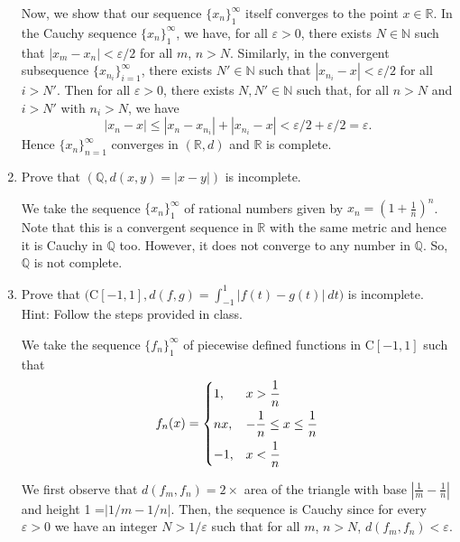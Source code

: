\documentclass[12pt]{article}
\newcommand{\rl}{\mathbb{R}}
\newcommand{\mQ}{\mathbb{Q}}
\begin{document}
\begin{enumerate}
\begin{mybox}
    \vspace*{3mm}
    Now, we show that our sequence
    $\{x_n\}_1^\infty$ itself converges to the
    point $x\in \rl$. In the Cauchy sequence
    $\{x_n\}_1^\infty$, we have, for all
    $\varepsilon>0$, there exists
    $N\in \mathbb{N}$ such that
    $|x_m-x_n|<\varepsilon/2$ for all $m$, $n>N$.
    Similarly, in the convergent subsequence
    $\{x_{n_i}\}_{i=1}^\infty$, there exists
    $N'\in \mathbb{N}$ such that
    $|x_{n_i}-x|<\varepsilon/2$ for all
    $i>N'$. Then for all $\varepsilon>0$, there
    exists $N,N'\in \mathbb{N}$ such that,
    for all $n>N$ and $i>N'$ with $n_i>N$, we have
    $$|x_n-x|\leq |x_n-x_{n_i}|+|x_{n_i}-x|
    <\varepsilon/2+\varepsilon/2=\varepsilon.$$
    Hence $\{x_{n}\}_{n=1}^\infty$ converges in
    $(\rl,d)$ and $\rl$ is complete.
    
\end{mybox}
 
\item Prove that $(\mQ, d(x,y) = |x-y|)$ is incomplete.
\begin{mybox}

    We take the sequence $\{x_n\}_1^\infty$ of rational
    numbers given by
    $x_n=\left(1+\frac{1}{n}\right)^n$. Note that this
    is a convergent sequence in $\rl$ with the same
    metric and hence it is
    Cauchy in $\mQ$ too. However, it does not converge
    to any number in $\mQ$. So, $\mQ$ is not complete.
\end{mybox}
 
\item Prove that $\Big(\text{C}[-1,1], d(f,g) =
    \int_{-1}^1|f(t) - g(t)| \ dt\Big)$ is incomplete. \\
    Hint: Follow the steps provided in class.
\begin{mybox}

    We take the sequence $\{f_n\}_1^\infty$
    of piecewise defined functions in $\text{C}[-1,1]$
    such that
    $$f_n(x)=
    \begin{dcases}
        1,   & x>\frac{1}{n}\\
        nx,  & -\frac{1}{n}\leq x\leq \frac{1}{n}\\
        -1,  & x<\frac{1}{n}
    \end{dcases}$$

    We  first observe that
    $d(f_m,f_n)=2 \times$ area of the
    triangle with base $\left|\frac{1}{m}-
    \frac{1}{n}\right|$ and height 1
    =$\left|1/m-1/n\right|$. Then,
    the sequence is Cauchy
    since for every $\varepsilon>0$ we have
    an integer $N>1/\varepsilon$ such that
    for all $m$, $n>N$,
    $d(f_m,f_n)<\varepsilon$.


\end{mybox}
\end{enumerate}
\end{document}
